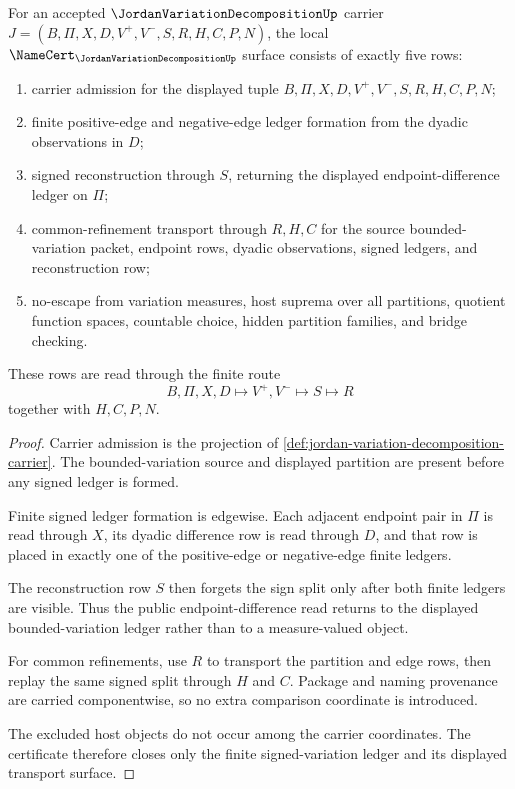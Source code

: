\begin{theorem}
\label{thm:jordan-variation-decomposition-namecert-obligations}
For an accepted $\JordanVariationDecompositionUp$ carrier $J=(B,\Pi,X,D,V^{+},V^{-},S,R,H,C,P,N)$, the local $\NameCert_{\JordanVariationDecompositionUp}$ surface consists of exactly five rows:
\begin{enumerate}
\item carrier admission for the displayed tuple $B,\Pi,X,D,V^{+},V^{-},S,R,H,C,P,N$;
\item finite positive-edge and negative-edge ledger formation from the dyadic observations in $D$;
\item signed reconstruction through $S$, returning the displayed endpoint-difference ledger on $\Pi$;
\item common-refinement transport through $R,H,C$ for the source bounded-variation packet, endpoint rows, dyadic observations, signed ledgers, and reconstruction row;
\item no-escape from variation measures, host suprema over all partitions, quotient function spaces, countable choice, hidden partition families, and bridge checking.
\end{enumerate}
These rows are read through the finite route
$$
B,\Pi,X,D\longmapsto V^{+},V^{-}\longmapsto S\longmapsto R
$$
together with $H,C,P,N$.
\end{theorem}
\begin{proof}
Carrier admission is the projection of \autoref{def:jordan-variation-decomposition-carrier}. The bounded-variation source and displayed partition are present before any signed ledger is formed.

Finite signed ledger formation is edgewise. Each adjacent endpoint pair in $\Pi$ is read through $X$, its dyadic difference row is read through $D$, and that row is placed in exactly one of the positive-edge or negative-edge finite ledgers.

The reconstruction row $S$ then forgets the sign split only after both finite ledgers are visible. Thus the public endpoint-difference read returns to the displayed bounded-variation ledger rather than to a measure-valued object.

For common refinements, use $R$ to transport the partition and edge rows, then replay the same signed split through $H$ and $C$. Package and naming provenance are carried componentwise, so no extra comparison coordinate is introduced.

The excluded host objects do not occur among the carrier coordinates. The certificate therefore closes only the finite signed-variation ledger and its displayed transport surface.
\end{proof}

